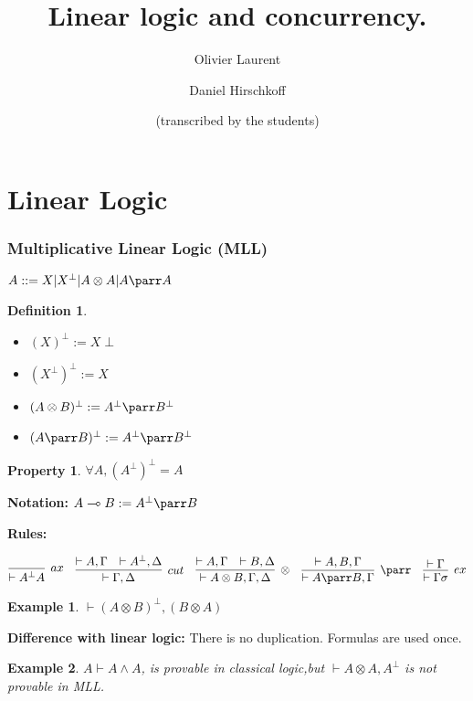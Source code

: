\documentclass[a4paper,10pt]{article}
\author{Olivier Laurent \and Daniel Hirschkoff \\ \and (transcribed by the students)}
\title{Linear logic and concurrency.}
\newtheorem{definition}{Definition}
\newtheorem{prop}{Property}
\newtheorem{ex}{Example}
\begin{document}
\maketitle
\part{Linear Logic}
\section{Multiplicative Linear Logic (MLL)}

$A ::= X | X ^ \perp | A \otimes A | A \parr A$

\begin{definition}
	\begin{itemize}
		\item $(X)^\perp := X \perp$
		\item $(X^\perp)^\perp := X$
		\item $(A \otimes B) ^\perp := A^\perp \parr B^\perp$ 
		\item $(A \parr B)^\perp := A ^\perp \parr B ^\perp$
	\end{itemize}	
\end{definition}

\begin{prop}
	$\forall A, (A ^\perp)^\perp = A$
\end{prop}

\textbf{Notation:} $A\multimap B :=  A ^\perp \parr B$

\textbf{Rules:}
\begin{center}
$	\infer[ax]{\vdash A^\perp A}{} \quad
	\infer[cut]{\vdash \Gamma, \Delta}{\vdash A, \Gamma & \vdash A^\perp, \Delta} \quad
	\infer[\otimes]{\vdash A \otimes B, \Gamma, \Delta}{\vdash A, \Gamma & \vdash B, \Delta} \quad
	\infer[\parr]{\vdash A \parr B, \Gamma}{\vdash A, B, \Gamma} \quad
	\infer[ex]{\vdash \Gamma \sigma}{\vdash \Gamma} 
$
\end{center}
	
\begin{ex} \label{ex:comm_par} $\vdash (A\otimes B)^\perp, (B\otimes A)$
\end{ex}

\textbf{Difference with linear logic:}
There is no duplication. Formulas are used once.

\begin{ex}
	$A \vdash A \land A$, is provable in classical logic,but $\vdash A\otimes A, A ^\perp$ is not provable in MLL.
\end{ex}
\end{document}
